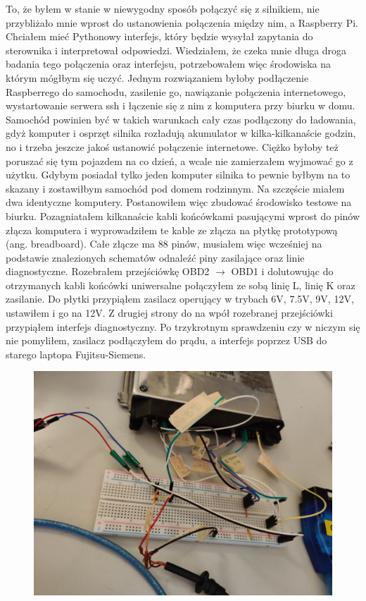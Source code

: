 \documentclass[declaration,shortabstract, inz]{iithesis}
\begin{document}
    To, że byłem w stanie w niewygodny sposób połączyć się z silnikiem, nie przybliżało mnie wprost do ustanowienia połączenia między nim, a Raspberry Pi.
    Chciałem mieć Pythonowy interfejs, który będzie wysyłał zapytania do sterownika i interpretował odpowiedzi. Wiedziałem, że czeka mnie długa droga badania tego połączenia oraz interfejsu, potrzebowałem więc środowiska na którym mógłbym się uczyć. Jednym rozwiązaniem byłoby podłączenie Raspberrego do samochodu, zasilenie go, nawiązanie połączenia internetowego, wystartowanie serwera ssh i łączenie się z nim z komputera przy biurku w domu. Samochód powinien być w takich warunkach cały czas podłączony do ładowania, gdyż komputer i osprzęt silnika rozładują akumulator w kilka-kilkanaście godzin, no i trzeba jeszcze jakoś ustanowić połączenie internetowe. Ciężko byłoby też poruszać się tym pojazdem na co dzień, a wcale nie zamierzałem wyjmować go z użytku. Gdybym posiadał tylko jeden komputer silnika to pewnie byłbym na to skazany i zostawiłbym samochód pod domem rodzinnym. Na szczęście miałem dwa identyczne komputery. Postanowiłem więc zbudować środowisko testowe na biurku. Pozagniatałem kilkanaście kabli końcówkami pasującymi wprost do pinów złącza komputera i wyprowadziłem te kable ze złącza na płytkę prototypową (ang. breadboard). Całe złącze ma 88 pinów, musiałem więc wcześniej na podstawie znalezionych schematów odnaleźć piny zasilające oraz linie diagnostyczne. Rozebrałem przejściówkę OBD2 $\rightarrow$ OBD1 i dolutowując do otrzymanych kabli końcówki uniwersalne połączyłem ze sobą linię L, linię K oraz zasilanie. Do płytki przypiąłem zasilacz operujący w trybach 6V, 7.5V, 9V, 12V, ustawiłem i go na 12V. Z drugiej strony do na wpół rozebranej przejściówki przypiąłem interfejs diagnostyczny. Po trzykrotnym sprawdzeniu czy w niczym się nie pomyliłem, zasilacz podłączyłem do prądu, a interfejs poprzez USB do starego laptopa Fujitsu-Siemens.
    
    \begin{figure}[htp]
        \centering
        \includegraphics[width=12cm]{images/test_setup_close.jpg}
        \label{fig:test_setup_close}
    \end{figure}
    \FloatBarrier
    
\end{document}
